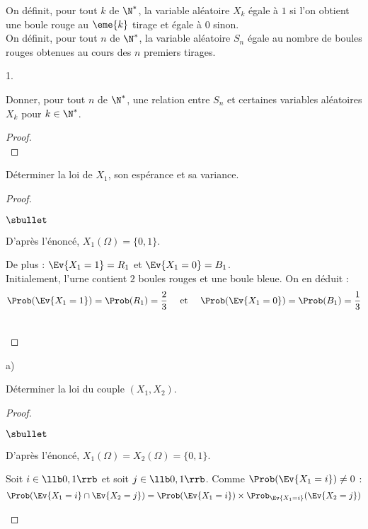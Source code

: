 \documentclass[11pt]{article}%
\begin{document}
\noindent 
On définit, pour tout $k$ de $\N^*$, la variable aléatoire $X_k$ égale
à $1$ si l'on obtient une boule rouge au $\eme{k}$ tirage et égale à
$0$ sinon.\\
On définit, pour tout $n$ de $\N^*$, la variable aléatoire $S_n$ égale
au nombre de boules rouges obtenues au cours des $n$ premiers tirages.
\begin{noliste}{1.}
  \setcounter{enumi}{4}
\item Donner, pour tout $n$ de $\N^*$, une relation entre $S_n$ et
  certaines variables aléatoires $X_k$ pour $k \in \N^*$.
  
  \begin{proof}~%
    ~\\[-1cm]
  \end{proof}

\item Déterminer la loi de $X_1$, son espérance et sa variance.

  \begin{proof}~
    \begin{noliste}{$\sbullet$}
    \item D'après l'énoncé, $X_1(\Omega) = \{0, 1\}$.
    \item De plus : $\Ev{X_1 = 1} = R_1$ et $\Ev{X_1 = 0} = B_1$.\\
      Initialement, l'urne contient $2$ boules rouges et une boule
      bleue. On en déduit :
      \[
      \Prob(\Ev{X_1 = 1}) = \Prob(R_1) = \dfrac{2}{3} \quad \mbox{ et
      } \quad \Prob(\Ev{X_1 = 0}) = \Prob(B_1) = \dfrac{1}{3}
      \]      
    \end{noliste}
    ~\\[-1cm]
  \end{proof}

\item
  \begin{noliste}{a)}
  \item Déterminer la loi du couple $(X_1, X_2)$.

    \begin{proof}~
      \begin{noliste}{$\sbullet$}
      \item D'après l'énoncé, $X_1(\Omega) = X_2(\Omega) = \{0, 1\}$.
      \item Soit $i \in \llb 0, 1 \rrb$ et soit $j \in \llb 0, 1
        \rrb$. Comme $\Prob(\Ev{X_1 = i}) \neq 0$ :
        \[
        \Prob(\Ev{X_1 = i} \cap \Ev{X_2 = j}) = \Prob(\Ev{X_1 = i})
        \times \Prob_{\Ev{X_1 = i}}(\Ev{X_2 = j})
        \]



\end{noliste}
\end{proof}
\end{noliste}
\end{noliste}
\end{document}
